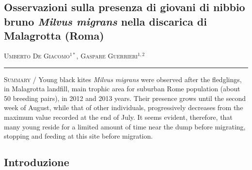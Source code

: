 \setcounter{figure}{0}
\setcounter{table}{0}

\begin{adjustwidth}{-3.5cm}{0cm}
\pagestyle{CIOpage}
\chapter*[Il nibbio bruno nella discarica di Malagrotta (Roma)]{Osservazioni sulla presenza di giovani di nibbio bruno \textbf{\textit{Milvus migrans}}\textbf{ nella discarica di Malagrotta
(Roma)}}

\textsc{Umberto De Giacomo}$^{1*}$, \textsc{Gaspare Guerrieri}$^{1,2}$ \\

 
\noindent\color{MUSEBLUE}\rule{27cm}{2pt}
\vspace{1cm}
\end{adjustwidth}

{\small
\noindent \textsc{\color{MUSEBLUE} Summary} / Young black kites \textit{Milvus migrans}\textbf{ }were observed after
the fledglings, in Malagrotta landfill, main trophic area for suburban
Rome population (about 50 breeding pairs), in 2012 and 2013 years.
Their presence grows until the second week of August, while that of
other individuals, progressively decreases from the maximum value
recorded at the end of July. It seems evident, therefore, that many
young reside for a limited amount of time near the dump before
migrating, stopping and feeding at this site before migration.
}


\section*{Introduzione}

